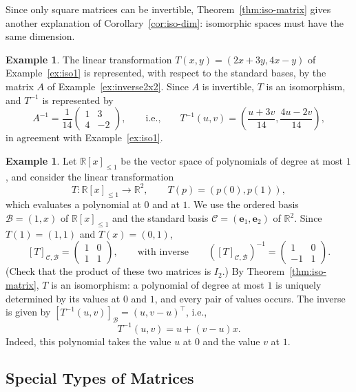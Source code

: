 \documentclass[11pt]{article}
\theoremstyle{definition}
\newtheorem{example}[definition]{Example}
\theoremstyle{plain}
\theoremstyle{remark}
\begin{document}
Since only square matrices can be invertible, Theorem~\ref{thm:iso-matrix} gives another explanation of Corollary~\ref{cor:iso-dim}: isomorphic spaces must have the same dimension.

\begin{example}
    The linear transformation $T(x, y) = (2x + 3y, 4x - y)$ of Example~\ref{ex:iso1} is represented, with respect to the standard bases, by the matrix $A$ of Example~\ref{ex:inverse2x2}. Since $A$ is invertible, $T$ is an isomorphism, and $T^{-1}$ is represented by
    \[A^{-1} = \frac{1}{14} \begin{pmatrix}
        1 & 3 \\
        4 & -2
    \end{pmatrix}, \qquad \text{i.e.,} \qquad T^{-1}(u, v) = \left(\frac{u + 3v}{14}, \frac{4u - 2v}{14}\right),\]
    in agreement with Example~\ref{ex:iso1}.
\end{example}

\begin{example}
    Let $\mathbb{R}[x]_{\leq 1}$ be the vector space of polynomials of degree at most $1$, and consider the linear transformation
    \[T: \mathbb{R}[x]_{\leq 1} \to \mathbb{R}^2, \qquad T(p) = (p(0), p(1)),\]
    which evaluates a polynomial at $0$ and at $1$. We use the ordered basis $\mathcal{B} = (1, x)$ of $\mathbb{R}[x]_{\leq 1}$ and the standard basis $\mathcal{C} = (\mathbf{e}_1, \mathbf{e}_2)$ of $\mathbb{R}^2$. Since $T(1) = (1, 1)$ and $T(x) = (0, 1)$,
    \[[T]_{\mathcal{C}, \mathcal{B}} = \begin{pmatrix}
        1 & 0 \\
        1 & 1
    \end{pmatrix}, \qquad \text{with inverse} \qquad ([T]_{\mathcal{C}, \mathcal{B}})^{-1} = \begin{pmatrix}
        1 & 0 \\
        -1 & 1
    \end{pmatrix}.\]
    (Check that the product of these two matrices is $I_2$.) By Theorem~\ref{thm:iso-matrix}, $T$ is an isomorphism: a polynomial of degree at most $1$ is uniquely determined by its values at $0$ and $1$, and every pair of values occurs. The inverse is given by $[T^{-1}(u, v)]_{\mathcal{B}} = (u, v - u)^\top$, i.e.,
    \[T^{-1}(u, v) = u + (v - u)x.\]
    Indeed, this polynomial takes the value $u$ at $0$ and the value $v$ at $1$.
\end{example}

\subsection{Special Types of Matrices}\label{subsec:special}
\end{document}
